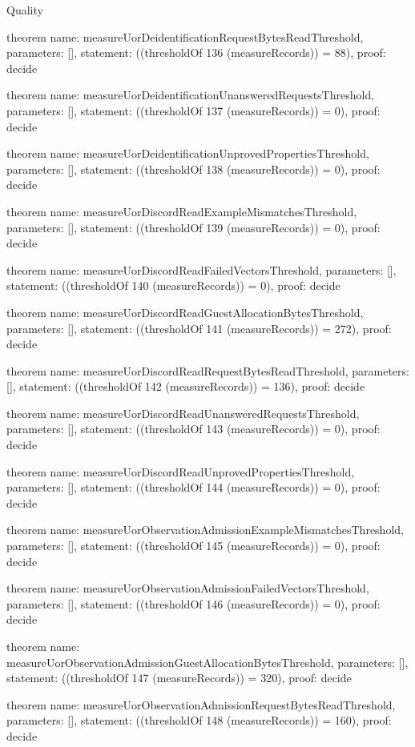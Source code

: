 \begin{lexlean}{Quality}
\begin{semanticmodule}
theorem{
  name: measureUorDeidentificationRequestBytesReadThreshold,
  parameters: [],
  statement: ((thresholdOf 136 (measureRecords)) = 88),
  proof: decide{}
}

theorem{
  name: measureUorDeidentificationUnansweredRequestsThreshold,
  parameters: [],
  statement: ((thresholdOf 137 (measureRecords)) = 0),
  proof: decide{}
}

theorem{
  name: measureUorDeidentificationUnprovedPropertiesThreshold,
  parameters: [],
  statement: ((thresholdOf 138 (measureRecords)) = 0),
  proof: decide{}
}

theorem{
  name: measureUorDiscordReadExampleMismatchesThreshold,
  parameters: [],
  statement: ((thresholdOf 139 (measureRecords)) = 0),
  proof: decide{}
}

theorem{
  name: measureUorDiscordReadFailedVectorsThreshold,
  parameters: [],
  statement: ((thresholdOf 140 (measureRecords)) = 0),
  proof: decide{}
}

theorem{
  name: measureUorDiscordReadGuestAllocationBytesThreshold,
  parameters: [],
  statement: ((thresholdOf 141 (measureRecords)) = 272),
  proof: decide{}
}

theorem{
  name: measureUorDiscordReadRequestBytesReadThreshold,
  parameters: [],
  statement: ((thresholdOf 142 (measureRecords)) = 136),
  proof: decide{}
}

theorem{
  name: measureUorDiscordReadUnansweredRequestsThreshold,
  parameters: [],
  statement: ((thresholdOf 143 (measureRecords)) = 0),
  proof: decide{}
}

theorem{
  name: measureUorDiscordReadUnprovedPropertiesThreshold,
  parameters: [],
  statement: ((thresholdOf 144 (measureRecords)) = 0),
  proof: decide{}
}

theorem{
  name: measureUorObservationAdmissionExampleMismatchesThreshold,
  parameters: [],
  statement: ((thresholdOf 145 (measureRecords)) = 0),
  proof: decide{}
}

theorem{
  name: measureUorObservationAdmissionFailedVectorsThreshold,
  parameters: [],
  statement: ((thresholdOf 146 (measureRecords)) = 0),
  proof: decide{}
}

theorem{
  name: measureUorObservationAdmissionGuestAllocationBytesThreshold,
  parameters: [],
  statement: ((thresholdOf 147 (measureRecords)) = 320),
  proof: decide{}
}

theorem{
  name: measureUorObservationAdmissionRequestBytesReadThreshold,
  parameters: [],
  statement: ((thresholdOf 148 (measureRecords)) = 160),
  proof: decide{}
}


\end{semanticmodule}
\end{lexlean}
